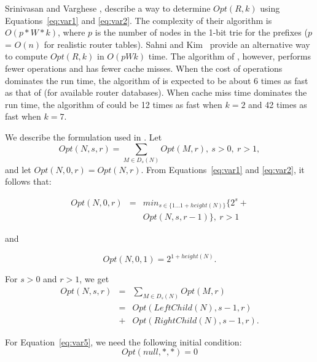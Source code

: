 Srinivasan and Varghese \cite{sri:expansion}, describe a way to determine
$Opt(R,k)$ using Equations~\ref{eq:var1} and \ref{eq:var2}. The complexity
of their algorithm is $O(p*W*k)$, where $p$ is the number of nodes in
the 1-bit trie for the prefixes ($p$ = $O(n)$ for realistic router tables).
Sahni and Kim~\cite{sahni2} provide an alternative way to compute
$Opt(R,k)$ in $O(pWk)$ time. The algorithm of \cite{sahni2}, however,
performs fewer operations and has fewer cache misses.
When the cost of operations dominates the run time, the algorithm of
\cite{sahni2} is expected
to be about 6 times as fast as that of
\cite{sri:expansion} (for available router databases).
When cache miss time dominates
the run time, the algorithm of \cite{sahni2}
could be 12 times as fast when $k = 2$ and
42 times as fast when $k = 7$.

We describe the formulation used in \cite{sahni2}.
Let 
$$Opt(N,s,r) = \sum_{M \in D_s(N)} Opt(M,r), \ s > 0, \ r > 1,$$
and let
$Opt(N, 0, r) = Opt(N,r)$.
From Equations~\ref{eq:var1} and \ref{eq:var2}, it follows that:

\begin{eqnarray}
Opt(N, 0, r) &=& min_{s \in \{1 \ldots 1+height(N)\}} \{2^s +\nonumber \\
& & Opt(N, s, r-1)\}, \ r > 1 \label{eq:var3}
\end{eqnarray}

and 

\begin{equation}\label{eq:var4}
Opt(N, 0, 1) = 2^{1+height(N)}.
\end{equation}

For $s > 0$ and $r > 1$, we get
\begin{eqnarray}\label{eq:var5}
Opt(N, s, r) &=& \sum_{M \in D_s(N)} Opt(M,r) \nonumber \\
&=& Opt(LeftChild(N), s-1, r) \nonumber \\
                 &+& Opt(RightChild(N), s-1, r).
\end{eqnarray}

For Equation~\ref{eq:var5}, we need the following initial condition:
\begin{equation}\label{eq:var6}
Opt(null, *, *) = 0
\end{equation}


